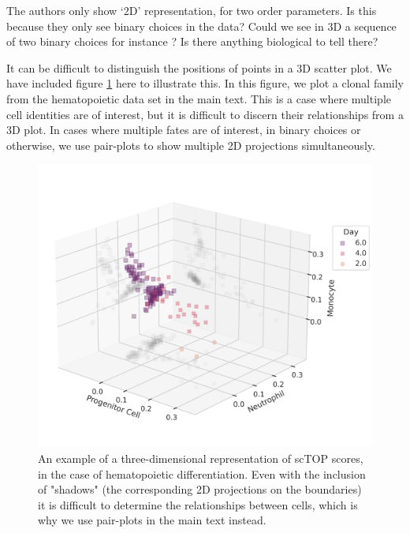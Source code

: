 \documentclass[12pt,american]{scrartcl}
\begin{document}
\begin{revcomment}
The authors only show ‘2D’ representation, for two order parameters. 
Is this because they only see binary choices in the data? Could we see 
in 3D a sequence of two binary choices for instance ? Is there anything 
biological to tell there?
\end{revcomment}
\begin{revresponse}
    It can be difficult to distinguish the positions of points in a 3D scatter plot. We have included figure \ref{3D plots} here to illustrate this. In this figure, we plot a clonal family from the hematopoietic data set in the main text. This is a case where multiple cell identities are of interest, but it is difficult to discern their relationships from a 3D plot. In cases where multiple fates are of interest, in binary choices or otherwise, we use pair-plots to show multiple 2D projections simultaneously.

    \begin{figure}
	\centering
    \includegraphics[scale=0.3]{figs/hem 3d neutrophil-monocyte.png}
	\caption{An example of a three-dimensional representation of scTOP scores, in the case of hematopoietic differentiation. Even with the inclusion of "shadows" (the corresponding 2D projections on the boundaries) it is difficult to determine the relationships between cells, which is why we use pair-plots in the main text instead. }
	\label{3D plots}
    \end{figure}
\end{revresponse}
\end{document}
